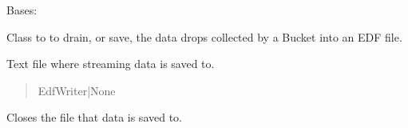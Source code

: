 \documentclass[letterpaper,10pt,english]{sphinxmanual}
\begin{document}
\begin{fulllineitems}
\label{\detokenize{PodApi.Stream.Drain:PodApi.Stream.Drain.ToEDF.DrainToEDF}}
\pysigstartsignatures
{}
\pysigstopsignatures
\sphinxAtStartPar
Bases: {\hyperref[\detokenize{PodApi.Stream.Drain:PodApi.Stream.Drain.ToFile.DrainToFile}]{}}

\sphinxAtStartPar
Class to to drain, or save, the data drops collected by a Bucket into an EDF file.

\begin{fulllineitems}
\label{\detokenize{PodApi.Stream.Drain:PodApi.Stream.Drain.ToEDF.DrainToEDF.file}}
\pysigstartsignatures
{}
\pysigstopsignatures
\sphinxAtStartPar
Text file where streaming data is saved to.
\begin{quote}\begin{description}
\sphinxAtStartPar
EdfWriter|None

\end{description}\end{quote}

\end{fulllineitems}


\begin{fulllineitems}
\label{\detokenize{PodApi.Stream.Drain:PodApi.Stream.Drain.ToEDF.DrainToEDF.CloseFile}}
\pysigstartsignatures
{}
\pysigstopsignatures
\sphinxAtStartPar
Closes the file that data is saved to.


\end{fulllineitems}
\end{fulllineitems}
\end{document}
